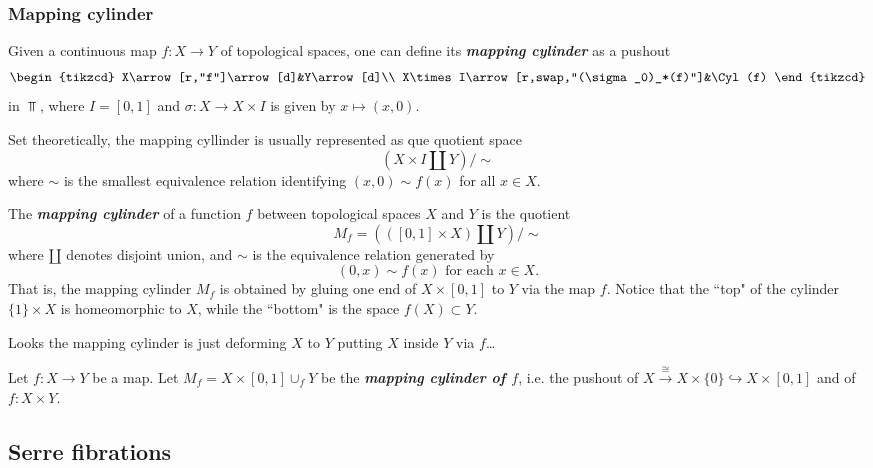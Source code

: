 \begin{remark}
\subsubsection{Mapping cylinder}

\begin{defn}
	Given a continuous map $f:X\to Y$ of topological spaces, one can define its \textbf{\textit{mapping cylinder}} as a pushout
	\[\begin{tikzcd}
		X\arrow[r,"f"]\arrow[d]&Y\arrow[d]\\
		X\times I\arrow[r,swap,"(\sigma_0)_*(f)"]&\Cyl(f)
	\end{tikzcd}\]
	in $\Top$, where $I=[0,1]$ and $\sigma:X\to X\times I$ is given by $x\mapsto(x,0)$.
	
	Set theoretically, the mapping cyllinder is usually represented as que quotient space
	\[\left(X\times I\coprod Y\right)\Big/\sim\]
	where $\sim$ is the smallest equivalence relation identifying $(x,0)\sim f(x)$ for all $x\in X$.
\end{defn}

\begin{defn}
	The \textbf{\textit{mapping cylinder}} of a function $f$ between topological spaces $X$ and $Y$ is the quotient
	\[M_f=(([0,1]\times X)\amalg Y)\big/\sim\]
	where $\amalg$ denotes disjoint union, and $\sim$ is the equivalence relation generated by
	\[(0,x)\sim f(x)\text{ for each }x\in X.\]
	{\color{persiangreen}That is, the mapping cylinder $M_f$ is obtained by gluing one end of $X\times[0,1]$ to $Y$ via the map $f$.} Notice that the ``top" of the cylinder $\{1\}\times X$ is homeomorphic to $X$, while the ``bottom" is the space $f(X)\subset Y$.
	
{\color{persiangreen}Looks the mapping cylinder is just deforming $X$ to $Y$ putting $X$ inside $Y$ via $f$…}
\end{defn}

\begin{defn}
	Let $f:X\to Y$ be a map. Let $M_f=X\times[0,1]\cup_fY$ be the \textbf{\textit{mapping cylinder of $f$}}, i.e. the pushout of $X\overset{\cong}{\to}X\times\{0\}\hookrightarrow X\times[0,1]$ and of $f:X\times Y$.
\end{defn}

\subsection{Serre fibrations}


\end{remark}
